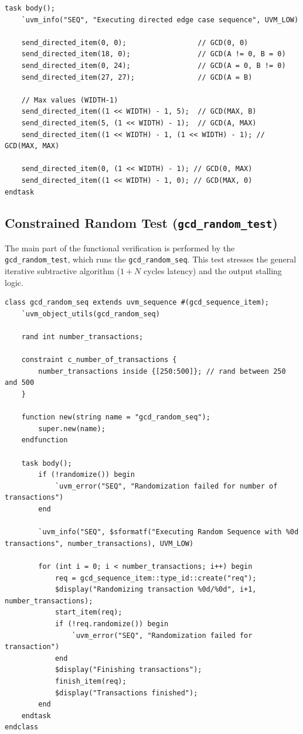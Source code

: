 \begin{verbatim}
task body();
    `uvm_info("SEQ", "Executing directed edge case sequence", UVM_LOW)

    send_directed_item(0, 0);                 // GCD(0, 0)
    send_directed_item(18, 0);                // GCD(A != 0, B = 0)
    send_directed_item(0, 24);                // GCD(A = 0, B != 0)
    send_directed_item(27, 27);               // GCD(A = B)
    
    // Max values (WIDTH-1)
    send_directed_item((1 << WIDTH) - 1, 5);  // GCD(MAX, B)
    send_directed_item(5, (1 << WIDTH) - 1);  // GCD(A, MAX)
    send_directed_item((1 << WIDTH) - 1, (1 << WIDTH) - 1); // GCD(MAX, MAX)

    send_directed_item(0, (1 << WIDTH) - 1); // GCD(0, MAX)
    send_directed_item((1 << WIDTH) - 1, 0); // GCD(MAX, 0)
endtask
\end{verbatim}

\subsection{Constrained Random Test (\texttt{gcd\_random\_test})}
The main part of the functional verification is performed by the \texttt{gcd\_random\_test}, which runs the \texttt{gcd\_random\_seq}. This test stresses the general iterative subtractive algorithm ($1+N$ cycles latency) and the output stalling logic.

\begin{verbatim}
class gcd_random_seq extends uvm_sequence #(gcd_sequence_item);
    `uvm_object_utils(gcd_random_seq)

    rand int number_transactions;

    constraint c_number_of_transactions {
        number_transactions inside {[250:500]}; // rand between 250 and 500
    }

    function new(string name = "gcd_random_seq");
        super.new(name);
    endfunction

    task body();
        if (!randomize()) begin
            `uvm_error("SEQ", "Randomization failed for number of transactions")
        end
        
        `uvm_info("SEQ", $sformatf("Executing Random Sequence with %0d transactions", number_transactions), UVM_LOW)

        for (int i = 0; i < number_transactions; i++) begin
            req = gcd_sequence_item::type_id::create("req");
            $display("Randomizing transaction %0d/%0d", i+1, number_transactions);
            start_item(req);
            if (!req.randomize()) begin
                `uvm_error("SEQ", "Randomization failed for transaction")
            end
            $display("Finishing transactions");
            finish_item(req);
            $display("Transactions finished");
        end
    endtask
endclass
\end{verbatim}


